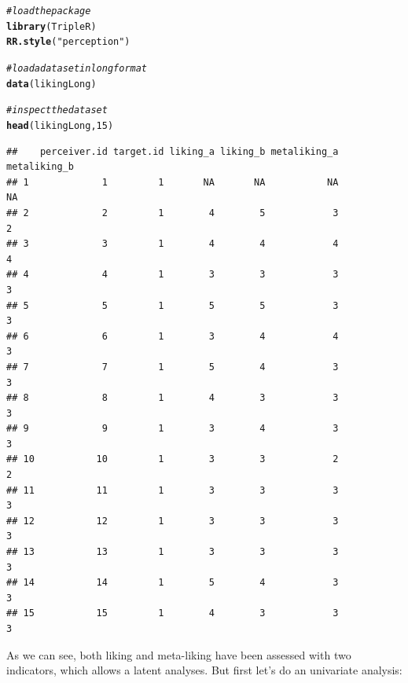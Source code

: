 \documentclass[a4paper]{article}\usepackage[]{graphicx}\usepackage[]{color}
\makeatletter
\newcommand{\hlnum}[1]{\textcolor[rgb]{0.686,0.059,0.569}{#1}}%
\newcommand{\hlstr}[1]{\textcolor[rgb]{0.192,0.494,0.8}{#1}}%
\newcommand{\hlcom}[1]{\textcolor[rgb]{0.678,0.584,0.686}{\textit{#1}}}%
\newcommand{\hlstd}[1]{\textcolor[rgb]{0.345,0.345,0.345}{#1}}%
\newcommand{\hlkwd}[1]{\textcolor[rgb]{0.737,0.353,0.396}{\textbf{#1}}}%
\newenvironment{kframe}{%
 \def\at@end@of@kframe{}%
 \ifinner\ifhmode%
  \def\at@end@of@kframe{\end{minipage}}%
  \begin{minipage}{\columnwidth}%
 \fi\fi%
 \def\FrameCommand##1{\hskip\@totalleftmargin \hskip-\fboxsep
 \colorbox{shadecolor}{##1}\hskip-\fboxsep
     \hskip-\linewidth \hskip-\@totalleftmargin \hskip\columnwidth}%
 \MakeFramed {\advance\hsize-\width
   \@totalleftmargin\z@ \linewidth\hsize
   \@setminipage}}%
 {\par\unskip\endMakeFramed%
 \at@end@of@kframe}
\newenvironment{knitrout}{}{} %
\makeatother
\begin{document}
\begin{knitrout}\small
{}\color{fgcolor}\begin{kframe}
\begin{alltt}
\hlcom{# load the package}
\hlkwd{library}\hlstd{(TripleR)}
\hlkwd{RR.style}\hlstd{(}\hlstr{"perception"}\hlstd{)}

\hlcom{# load a data set in long format}
\hlkwd{data}\hlstd{(likingLong)}

\hlcom{# inspect the data set}
\hlkwd{head}\hlstd{(likingLong,} \hlnum{15}\hlstd{)}
\end{alltt}
\begin{verbatim}
##    perceiver.id target.id liking_a liking_b metaliking_a metaliking_b
## 1             1         1       NA       NA           NA           NA
## 2             2         1        4        5            3            2
## 3             3         1        4        4            4            4
## 4             4         1        3        3            3            3
## 5             5         1        5        5            3            3
## 6             6         1        3        4            4            3
## 7             7         1        5        4            3            3
## 8             8         1        4        3            3            3
## 9             9         1        3        4            3            3
## 10           10         1        3        3            2            2
## 11           11         1        3        3            3            3
## 12           12         1        3        3            3            3
## 13           13         1        3        3            3            3
## 14           14         1        5        4            3            3
## 15           15         1        4        3            3            3
\end{verbatim}
\end{kframe}
\end{knitrout}

As we can see, both liking and meta-liking have been assessed with two indicators, which allows a latent analyses. But first let's do an univariate analysis:
\end{document}
